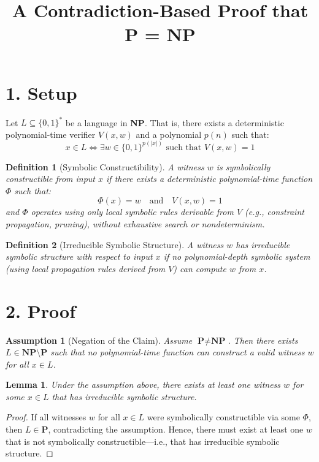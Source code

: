 \documentclass[12pt]{article}
\title{A Contradiction-Based Proof that \textbf{P = NP}}
\author{}
\date{}
\newtheorem{definition}{Definition}
\newtheorem{lemma}{Lemma}
\newtheorem{assumption}{Assumption}
\begin{document}
\maketitle

\section*{1. Setup}

Let $L \subseteq \{0,1\}^*$ be a language in \textbf{NP}. That is, there exists a deterministic polynomial-time verifier $V(x, w)$ and a polynomial $p(n)$ such that:
\[
x \in L \iff \exists w \in \{0,1\}^{p(|x|)} \text{ such that } V(x, w) = 1
\]

\begin{definition}[Symbolic Constructibility]
A witness $w$ is \emph{symbolically constructible} from input $x$ if there exists a deterministic polynomial-time function $\Phi$ such that:
\[
\Phi(x) = w \quad \text{and} \quad V(x, w) = 1
\]
and $\Phi$ operates using only local symbolic rules derivable from $V$ (e.g., constraint propagation, pruning), without exhaustive search or nondeterminism.
\end{definition}

\begin{definition}[Irreducible Symbolic Structure]
A witness $w$ has \emph{irreducible symbolic structure} with respect to input $x$ if no polynomial-depth symbolic system (using local propagation rules derived from $V$) can compute $w$ from $x$.
\end{definition}

\section*{2. Proof}

\begin{assumption}[Negation of the Claim]
Assume $\textbf{P} \ne \textbf{NP}$. Then there exists $L \in \textbf{NP} \setminus \textbf{P}$ such that no polynomial-time function can construct a valid witness $w$ for all $x \in L$.
\end{assumption}

\begin{lemma}
Under the assumption above, there exists at least one witness $w$ for some $x \in L$ that has irreducible symbolic structure.
\end{lemma}

\begin{proof}
If all witnesses $w$ for all $x \in L$ were symbolically constructible via some $\Phi$, then $L \in \textbf{P}$, contradicting the assumption. Hence, there must exist at least one $w$ that is not symbolically constructible—i.e., that has irreducible symbolic structure.
\end{proof}
\end{document}
